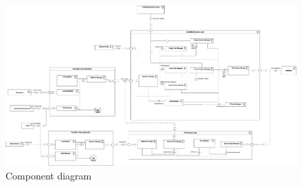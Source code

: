 \documentclass[titlepage]{article}
\begin{document}
\begin{figure}[H]
	\center
  	\includegraphics[width=15cm]{ComponentDiagram.png}
  	\caption{Component diagram}
 	\label{fig:COMPDIA}
\end{figure}
\end{document}
